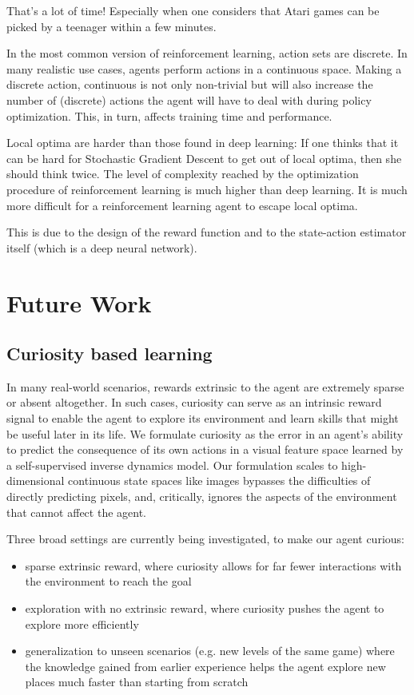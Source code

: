 \documentclass[conference]{IEEEtran}
\begin{document}
That’s a lot of time! Especially when one considers that Atari games can be picked by a teenager within a few minutes.

In the most common version of reinforcement learning, action sets are discrete. In many realistic use cases, agents perform actions in a continuous space. Making a discrete action, continuous is not only non-trivial but will also increase the number of (discrete) actions the agent will have to deal with during policy optimization. This, in turn, affects training time and performance.

Local optima are harder than those found in deep learning: If one thinks that it can be hard for Stochastic Gradient Descent to get out of local optima, then she should think twice. The level of complexity reached by the optimization procedure of reinforcement learning is much higher than deep learning. It is much more difficult for a reinforcement learning agent to escape local optima.

This is due to the design of the reward function and to the state-action estimator itself (which is a deep neural network).

\section{Future Work}

\subsection{\textbf{Curiosity based learning}}

In many real-world scenarios, rewards extrinsic to the agent are extremely sparse or absent altogether. In such cases, curiosity can serve as an intrinsic reward signal to enable the agent to explore its environment and learn skills that might be useful later in its life. We formulate curiosity as the error in an agent's ability to predict the consequence of its own actions in a visual feature space learned by a self-supervised inverse dynamics model. Our formulation scales to high-dimensional continuous state spaces like images bypasses the difficulties of directly predicting pixels, and, critically, ignores the aspects of the environment that cannot affect the agent.

Three broad settings are currently being investigated, to make our agent curious:

\begin{itemize}
\item sparse extrinsic reward, where curiosity allows for far fewer interactions with the environment to reach the goal
\item exploration with no extrinsic reward, where curiosity pushes the agent to explore more efficiently
\item generalization to unseen scenarios (e.g. new levels of the same game) where the knowledge gained from earlier experience helps the agent explore new places much faster than starting from scratch
\end{itemize}
\end{document}
